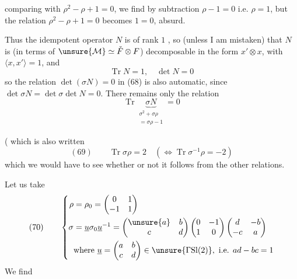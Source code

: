 comparing with $\rho^2-\rho+1=0$, we find  by subtraction $\rho-1=0$ i.e. $\rho=1$, but the relation $\rho^2-\rho+1=0$ becomes $1=0$, absurd.

Thus the idempotent operator $N$ is  of rank $1$ , so  (unless I am mistaken)  that $N$ is  (in terms of $\unsure{\mathcal M}\simeq\check F\otimes F$)  decomposable in the form $x'\otimes x$, with $\langle x,x'\rangle=1$, and 
\[
\operatorname{Tr}N=1,\quad\det N=0
\]
so the relation $\det(\sigma N)=0$ in (68) is also automatic, since $\det\sigma N=\det\sigma\det N=0$. There remains only the relation
\[
\operatorname{Tr}\underbrace{\sigma N}_{\substack{\sigma^2+\sigma\rho\\=\sigma\rho-1}}=0
\]

(  which is also written
\[
(69)\qquad \operatorname{Tr}\sigma\rho=2\quad(\Longleftrightarrow\operatorname{Tr}\sigma^{-1}\rho=-2)
\]
 which we would have to see whether or not it follows from the other relations.

Let us take
\[
(70)\qquad
\left\{\begin{aligned}
\rho&=\rho_0=\begin{pmatrix}0&1\\-1&1\end{pmatrix}\\
\sigma&=\underline u\sigma_0\underline u^{-1}
=\begin{pmatrix}\unsure{a}&b\\c&d\end{pmatrix}
\begin{pmatrix}0&-1\\1&0\end{pmatrix}
\begin{pmatrix}d&-b\\-c&a\end{pmatrix}\\
&\text{where }\underline u=\begin{pmatrix}a&b\\c&d\end{pmatrix}\in\unsure{\Gamma\mathrm{Sl}(2)},\text{ i.e. }ad-bc=1
\end{aligned}\right.
\]
We find


